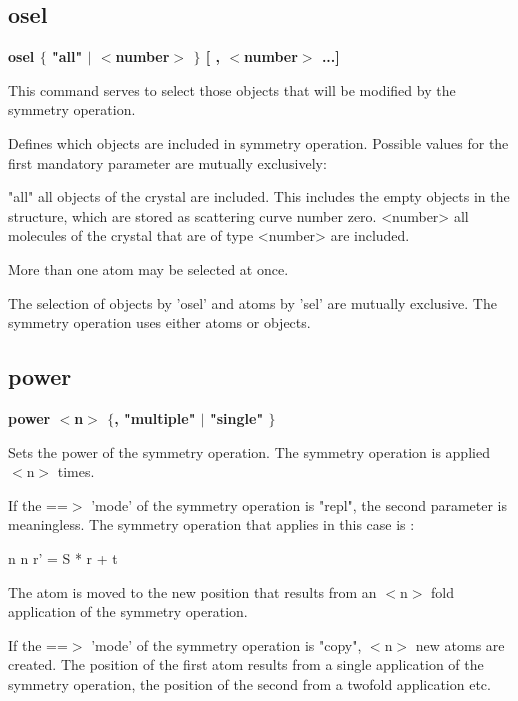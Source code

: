 \subsection*{osel}
{\bf osel $ \{$ "all" $| $ $ <$number$> $ $\} $ [ , $ <$number$> $ ...] \par }
\par
\vspace{3pt}
This command serves to select 
those objects that will be modified by the symmetry operation. 
\par
Defines which objects are included in symmetry operation. Possible values 
for the first mandatory parameter are mutually exclusively: 
\par
\begin{MacVerbatim}
"all"     all objects of the crystal are included.
          This includes the empty objects in the structure, which are
          stored as scattering curve number zero.
<number>  all molecules of the crystal that are of type <number>
          are included.
\end{MacVerbatim}
More than one atom may be selected at once. 
\par
The selection of objects by 'osel' and atoms by 'sel' are mutually 
exclusive. The symmetry operation uses either atoms or objects. 
\subsection*{power}
{\bf power $ <$n$> $ $ \{$, "multiple" $| $ "single" $\} $ \par }
\par
\vspace{3pt}
Sets the power of the symmetry operation. The symmetry operation is 
applied $ <$n$> $ times. 
\par
If the ==$> $ 'mode' of the symmetry operation is "repl", the second 
parameter is meaningless. The symmetry operation that applies in 
this case is : 
\par
\begin{MacVerbatim}
       n         n
 r' = S  * r  + t
\end{MacVerbatim}
The atom is moved to the new position that results from an $ <$n$> $ fold 
application of the symmetry operation. 
\par
If the ==$> $ 'mode' of the symmetry operation is "copy", $ <$n$> $ new atoms 
are created. The position of the first atom results from a single 
application of the symmetry operation, the position of the second from 
a twofold application etc. 
